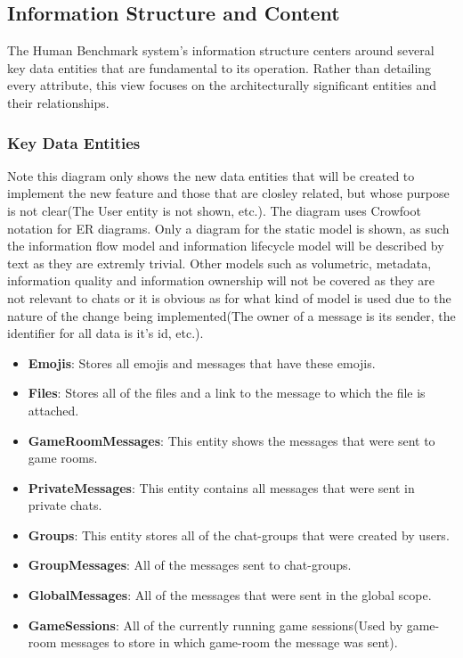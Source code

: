 \subsection{Information Structure and Content}

The Human Benchmark system's information structure centers around several key data entities that are fundamental to its operation. Rather than detailing every attribute, this view focuses on the architecturally significant entities and their relationships.

\subsubsection{Key Data Entities}

Note this diagram only shows the new data entities that will be created to implement the new feature and those that are closley related, but whose purpose is not clear(The User entity is not shown, etc.). The diagram uses Crowfoot notation for ER diagrams.
Only a diagram for the static model is shown, as such the information flow model and information lifecycle model will be described by text as they are extremly trivial. Other models such as volumetric, metadata, information quality and information ownership will not be covered as they are not relevant to chats or it is obvious as for what kind of model is used due to the nature of the change being implemented(The owner of a message is its sender, the identifier for all data is it's id, etc.).

\begin{itemize}
    \item \textbf{Emojis}: Stores all emojis and messages that have these emojis.
    \item \textbf{Files}: Stores all of the files and a link to the message to which the file is attached.
    \item \textbf{GameRoomMessages}: This entity shows the messages that were sent to game rooms.
    \item \textbf{PrivateMessages}: This entity contains all messages that were sent in private chats.
    \item \textbf{Groups}: This entity stores all of the chat-groups that were created by users.
    \item \textbf{GroupMessages}: All of the messages sent to chat-groups.
    \item \textbf{GlobalMessages}: All of the messages that were sent in the global scope.
    \item \textbf{GameSessions}: All of the currently running game sessions(Used by game-room messages to store in which game-room the message was sent).
\end{itemize}


